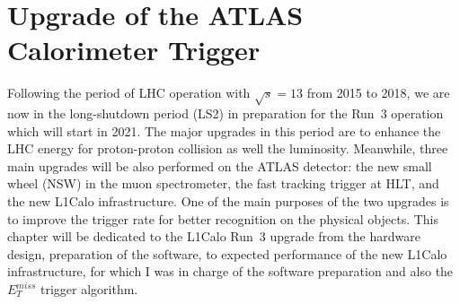 \chapter{Upgrade of the ATLAS Calorimeter Trigger}
Following the period of LHC operation with $\sqrt{s}=13$ from 2015 to 2018, we are now in the long-shutdown period (LS2) in preparation for the Run~3 operation which will start in 2021. The major upgrades in this period are to enhance the LHC energy for proton-proton collision as well the luminosity. Meanwhile, three main upgrades will be also performed on the ATLAS detector: the new small wheel (NSW) in the muon spectrometer\cite{STELZER20161160}, the fast tracking trigger at HLT\cite{Shochet:1552953}, and the new L1Calo infrastructure. One of the main purposes of the two upgrades is to improve the trigger rate for better recognition on the physical objects. This chapter will be dedicated to the L1Calo Run~3 upgrade from the hardware design, preparation of the software, to expected performance of the new L1Calo infrastructure, for which I was in charge of the software preparation and also the $E^{miss}_{T}$ trigger algorithm. 
